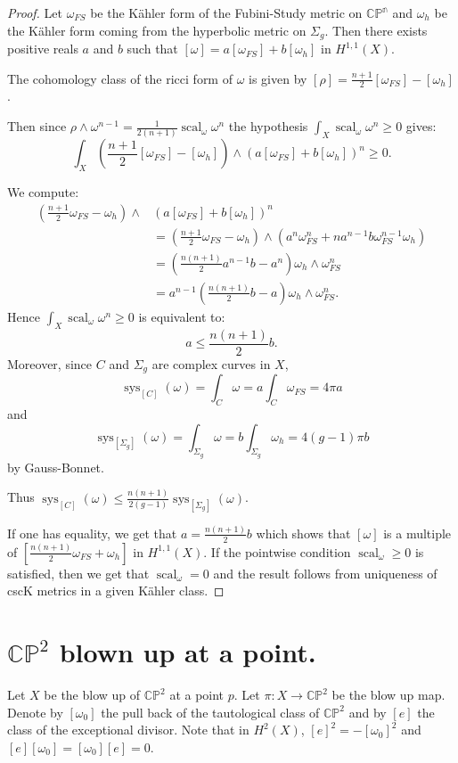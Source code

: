 \documentclass{amsart}
\numberwithin{equation}{section}
\theoremstyle{definition}
\DeclareMathOperator{\scal}{scal}
\DeclareMathOperator{\sys}{sys}
\begin{document}
\begin{proof}
Let $\omega_{FS}$ be the K\"ahler form of the Fubini-Study metric on $\mathbb{CP^n}$ and $\omega_h$ be the K\"ahler form coming from the hyperbolic metric on $\Sigma_g$.
Then there exists positive reals $a$ and $b$ such that $[\omega]=a[\omega_{FS}]+b[\omega_h]$ in $H^{1,1}(X)$.

The cohomology class of the ricci form of $\omega$ is given by
$[\rho]=\frac{n+1}{2}[\omega_{FS}]-[\omega_h]$.

Then since $\rho\wedge\omega^{n-1}=\frac{1}{2(n+1)}\scal_\omega\omega^n$ the hypothesis $\int_X\scal_\omega\omega^n\geq 0$ gives:
\[\int_X \left (\frac{n+1}{2}[\omega_{FS}]-[\omega_h]\right)\wedge \left(a[\omega_{FS}]+b[\omega_h]\right)^n\geq 0.\]

We compute:
\begin{align*}
\left (\frac{n+1}{2}\omega_{FS}-\omega_h\right)\wedge & \left(a[\omega_{FS}]+b[\omega_h]\right)^n\\
&=\left(\frac{n+1}{2}\omega_{FS}-\omega_h\right)\wedge(a^n\omega_{FS}^n+na^{n-1}b\omega_{FS}^{n-1}\omega_h)\\
&=\left(\frac{n(n+1)}{2}a^{n-1}b-a^n\right)\omega_h\wedge\omega_{FS}^n\\
&=a^{n-1}\left(\frac{n(n+1)}{2}b-a\right)\omega_h\wedge\omega_{FS}^n.
\end{align*}
Hence $\int_X\scal_{\omega}\omega^n\geq 0$ is equivalent to:
\[a\leq\frac{n(n+1)}{2}b.\]
Moreover, since $C$ and $\Sigma_g$ are complex curves in $X$, \[\sys_{[C]}(\omega)=\int_C\omega=a\int_C\omega_{FS}=4\pi a\]
and
\[\sys_{[\Sigma_g]}(\omega)=\int_{\Sigma_g}\omega=b\int_{\Sigma_g}\omega_{h}=4(g-1)\pi b\] by Gauss-Bonnet.

Thus $\sys_{[C]}(\omega)\leq\frac{n(n+1)}{2(g-1)}\sys_{[\Sigma_g]}(\omega)$.

If one has equality, we get that $a=\frac{n(n+1)}{2}b$ which shows that $[\omega]$ is a multiple of $[\frac{n(n+1)}{2}\omega_{FS}+\omega_h]$ in $H^{1,1}(X)$. If the pointwise condition $\scal_\omega\geq 0$ is satisfied, then we get that $\scal_\omega=0$ and the result follows from uniqueness of cscK metrics in a given K\"ahler class.
\end{proof}

\section{$\mathbb{CP}^2$ blown up at a point.}

Let $X$ be the blow up of $\mathbb{CP}^2$ at a point $p$. Let $\pi:X\to\mathbb{CP}^2$ be the blow up map. Denote by $[\omega_0]$ the pull back of the tautological class of $\mathbb{CP}^2$ and by $[e]$ the class of the exceptional divisor. Note that in $H^2(X)$, $[e]^2=-[\omega_0]^2$ and $[e][\omega_0]=[\omega_0][e]=0$.
\end{document}
